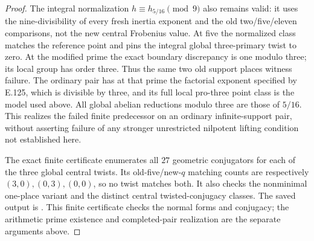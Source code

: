 \begin{proof}
The integral normalization
\(h\equiv h_{5/16}\pmod9\)
also remains valid: it uses the
nine-divisibility of every fresh
inertia exponent and the old
two/five/eleven comparisons,
not the new central Frobenius
value.
At five the normalized class
matches the reference point and
pins the integral global
three-primary twist to zero.
At the modified prime the exact
boundary discrepancy is one
modulo three; its local group
has order three.
Thus the same two old support
places witness failure.
The ordinary pair has at that
prime the factorial exponent
specified by E.125, which is
divisible by three, and its
full local pro-three point class
is the model used above.
All global abelian reductions
modulo three are those of
\(5/16\).
This realizes the failed finite
predecessor on an ordinary
infinite-support pair, without
asserting failure of any stronger
unrestricted nilpotent lifting
condition not established here.

The exact finite certificate
enumerates all \(27\) geometric
conjugators for each of the three
global central twists.
Its old-five/new-\(q\) matching
counts are respectively
\((3,0),(0,3),(0,0)\), so no twist
matches both.
It also checks the nonminimal
one-place variant and the distinct
central twisted-conjugacy classes.
The saved output is
.
This finite certificate checks
the normal forms and conjugacy;
the arithmetic prime existence
and completed-pair realization
are the separate arguments above.
\end{proof}
